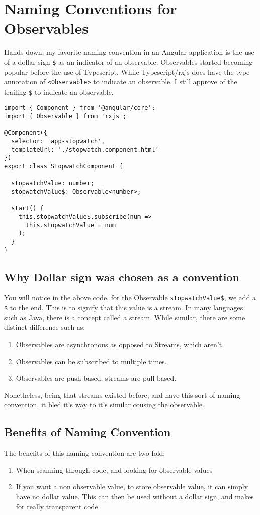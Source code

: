 \section{Naming Conventions for Observables}
Hands down, my favorite naming convention in an Angular application is the use of a 
dollar sign \lstinline{$} as an indicator of an observable. Observables started 
becoming popular before the use of Typescript. While Typescript/rxjs does have 
the type annotation of \lstinline{<Observable>} to indicate an observable, I still
approve of the trailing \lstinline{$} to indicate an observable. 

\begin{lstlisting}[caption=Observable Naming Convention]
import { Component } from '@angular/core';
import { Observable } from 'rxjs';

@Component({
  selector: 'app-stopwatch',
  templateUrl: './stopwatch.component.html'
})
export class StopwatchComponent {

  stopwatchValue: number;
  stopwatchValue$: Observable<number>;

  start() {
    this.stopwatchValue$.subscribe(num =>
      this.stopwatchValue = num
    );
  }
}  
\end{lstlisting}

\subsection{Why Dollar sign was chosen as a convention}
You will notice in the above code, for the Observable 
\lstinline{stopwatchValue$}, we add a \lstinline{$} to the end. This is to 
signify that this value is a stream. In many languages such as Java, there is a 
concept called a stream. While similar, there are some distinct difference such 
as: 
\begin{enumerate}
  \item Observables are asynchronous as opposed to Streams, which aren't.
  \item Observables can be subscribed to multiple times. 
  \item Observables are push based, streams are pull based.
\end{enumerate}

Nonetheless, being that streams existed before, and have this sort of naming 
convention, it bled it's way to it's similar cousing the observable. 

\subsection{Benefits of Naming Convention}
The benefits of this naming convention are two-fold: 
\begin{enumerate}
  \item When scanning through code, and looking for observable values
  \item If you want a non observable value, to store observable value, 
  it can simply have no dollar value. This can then be used without a dollar 
  sign, and makes for really transparent code. 
\end{enumerate}